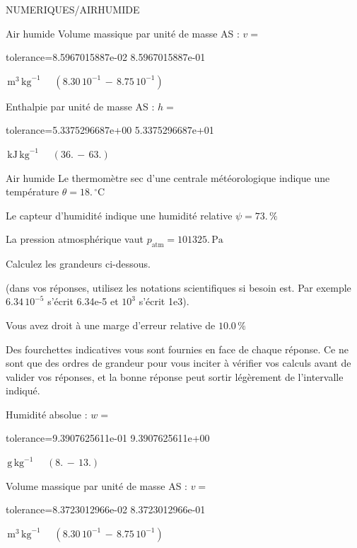 \documentclass[12pt]{article}
\begin{document}
\begin{quiz}{NUMERIQUES/AIRHUMIDE}
\begin{cloze}{Air humide}
Volume massique par unité de masse AS : $v =  $
\begin{numerical}[points=1] 
\item[tolerance={8.5967015887e-02}] 8.5967015887e-01 
\end{numerical} 
 $\,  \mathrm{m}^{3}\,  \mathrm{kg}^{-1}$ 
 $ \quad ( 8.30 \, 10^{-1}  \, - \,  8.75 \, 10^{-1} ) $ 

Enthalpie par unité de masse AS : $h =  $
\begin{numerical}[points=2] 
\item[tolerance={5.3375296687e+00}] 5.3375296687e+01 
\end{numerical} 
 $\,  \mathrm{kJ}\,  \mathrm{kg}^{-1}$ 
 $ \quad (36. \, - \, 63.) $ 

\end{cloze} 


 \begin{cloze}{Air humide} 
Le thermomètre sec d’une centrale météorologique indique une température $\theta = 18.\,  \mathrm{^\circ\mathrm{C}} $

Le capteur d'humidité indique une humidité relative $\psi = 73.\, \% $

La pression atmosphérique vaut $p_{\text{atm}} = 101325.\,  \mathrm{Pa} $

 

Calculez les grandeurs ci-dessous.

(dans vos réponses, utilisez les notations scientifiques si besoin est. Par exemple $6.34\, 10^{-5}$ s'écrit 6.34e-5 et $10^{3}$ s'écrit 1e3).

Vous avez droit à une marge d'erreur relative de $10.0\, \% $

Des fourchettes indicatives vous sont fournies en face de chaque réponse. Ce ne sont que des ordres de grandeur pour vous inciter à vérifier vos calculs avant de valider vos réponses, et la bonne réponse peut sortir légèrement de l'intervalle indiqué.

Humidité absolue : $w =  $
\begin{numerical}[points=1] 
\item[tolerance={9.3907625611e-01}] 9.3907625611e+00 
\end{numerical} 
 $\,  \mathrm{g}\,  \mathrm{kg}^{-1}$ 
 $ \quad (8. \, - \, 13.) $ 

Volume massique par unité de masse AS : $v =  $
\begin{numerical}[points=1] 
\item[tolerance={8.3723012966e-02}] 8.3723012966e-01 
\end{numerical} 
 $\,  \mathrm{m}^{3}\,  \mathrm{kg}^{-1}$ 
 $ \quad ( 8.30 \, 10^{-1}  \, - \,  8.75 \, 10^{-1} ) $ 


\end{cloze}
\end{quiz}
\end{document}
